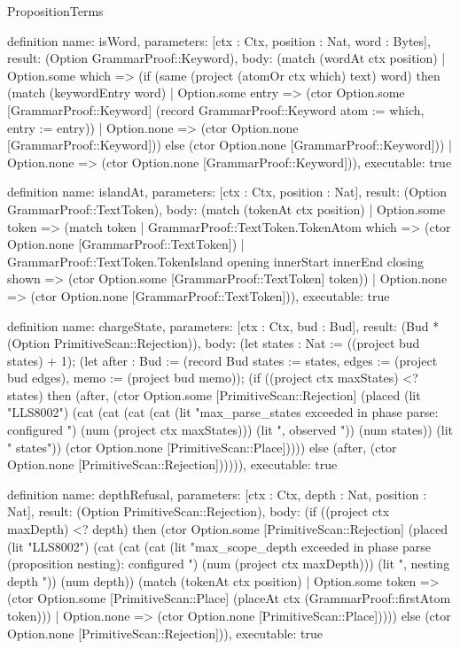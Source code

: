 \begin{lexlean}{PropositionTerms}
\begin{semanticmodule}
definition{
  name: isWord,
  parameters: [ctx : Ctx, position : Nat, word : Bytes],
  result: (Option GrammarProof::Keyword),
  body: (match (wordAt ctx position)
    | Option.some which => (if (same (project (atomOr ctx which) text) word) then (match (keywordEntry word)
      | Option.some entry => (ctor Option.some [GrammarProof::Keyword] (record GrammarProof::Keyword {atom := which, entry := entry}))
      | Option.none => (ctor Option.none [GrammarProof::Keyword])) else (ctor Option.none [GrammarProof::Keyword]))
    | Option.none => (ctor Option.none [GrammarProof::Keyword])),
  executable: true
}

definition{
  name: islandAt,
  parameters: [ctx : Ctx, position : Nat],
  result: (Option GrammarProof::TextToken),
  body: (match (tokenAt ctx position)
    | Option.some token => (match token
      | GrammarProof::TextToken.TokenAtom which => (ctor Option.none [GrammarProof::TextToken])
      | GrammarProof::TextToken.TokenIsland opening innerStart innerEnd closing shown => (ctor Option.some [GrammarProof::TextToken] token))
    | Option.none => (ctor Option.none [GrammarProof::TextToken])),
  executable: true
}

definition{
  name: chargeState,
  parameters: [ctx : Ctx, bud : Bud],
  result: (Bud * (Option PrimitiveScan::Rejection)),
  body: (let states : Nat := ((project bud states) + 1); (let after : Bud := (record Bud {states := states, edges := (project bud edges), memo := (project bud memo)}); (if ((project ctx maxStates) <? states) then (after, (ctor Option.some [PrimitiveScan::Rejection] (placed (lit "LLS8002") (cat (cat (cat (cat (lit "max_parse_states exceeded in phase parse: configured ") (num (project ctx maxStates))) (lit ", observed ")) (num states)) (lit " states")) (ctor Option.none [PrimitiveScan::Place])))) else (after, (ctor Option.none [PrimitiveScan::Rejection]))))),
  executable: true
}

definition{
  name: depthRefusal,
  parameters: [ctx : Ctx, depth : Nat, position : Nat],
  result: (Option PrimitiveScan::Rejection),
  body: (if ((project ctx maxDepth) <? depth) then (ctor Option.some [PrimitiveScan::Rejection] (placed (lit "LLS8002") (cat (cat (cat (lit "max_scope_depth exceeded in phase parse (proposition nesting): configured ") (num (project ctx maxDepth))) (lit ", nesting depth ")) (num depth)) (match (tokenAt ctx position)
    | Option.some token => (ctor Option.some [PrimitiveScan::Place] (placeAt ctx (GrammarProof::firstAtom token)))
    | Option.none => (ctor Option.none [PrimitiveScan::Place])))) else (ctor Option.none [PrimitiveScan::Rejection])),
  executable: true
}


\end{semanticmodule}
\end{lexlean}
